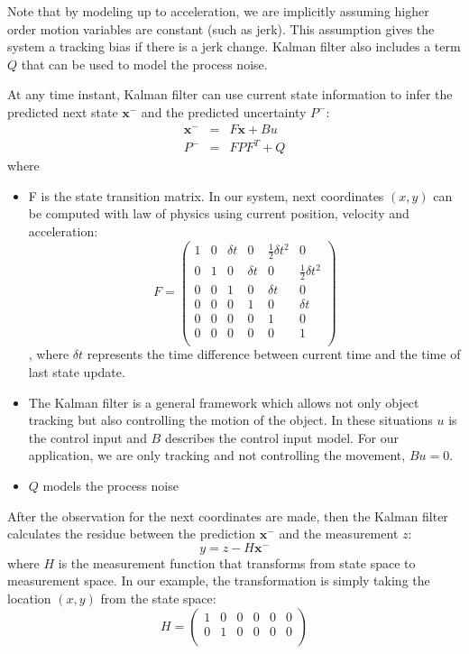 Note that by modeling up to acceleration, we are implicitly assuming higher order motion variables are constant (such as jerk). This assumption gives the system a tracking bias if there is a jerk change. Kalman filter also includes a term $Q$ that can be used to model the process noise. 

At any time instant, Kalman filter can use current state information to infer the predicted next state $\mathbf{x}^-$ and the predicted uncertainty $P^-$:
\begin{eqnarray}
\mathbf{x}^- & = &F \mathbf{x} + Bu\\
P^- & = & FPF^T + Q
\end{eqnarray}
where
\begin{itemize}
\item F is the state transition matrix. In our system, next coordinates $(x,y)$ can be computed with law of physics using current position, velocity and acceleration:
\[
F  =  \left(\begin{array}{cccccc}
1 & 0 & \delta t & 0 & \frac{1}{2}\delta t^2 & 0 \\
0 & 1 & 0 & \delta t & 0 & \frac{1}{2} \delta t^2 \\
0 & 0 & 1 & 0 & \delta t & 0\\
0 & 0 & 0 & 1 & 0 & \delta t\\
0 & 0 & 0 & 0 & 1 & 0 \\
0 & 0 & 0 & 0 & 0 & 1 \\
\end{array}\right)
\], where $\delta t$ represents the time difference between current time and the time of last state update. 
\item The Kalman filter is a general framework which allows not only object tracking but also controlling the motion of the object. In these situations $u$ is the control input and $B$ describes the control input model. For our application, we are only tracking and not controlling the movement, $Bu = 0$.
\item $Q$ models the process noise
\end{itemize}

After the observation for the next coordinates are made, then the Kalman filter calculates the residue between the prediction $\mathbf{x}^-$ and the measurement $z$:
\[
y = z - H\mathbf{x}^-
\]
where $H$ is the measurement function that transforms from state space to measurement space. In our example, the transformation is simply taking the location $(x,y)$ from the state space:
\[
H = \left(\begin{array}{cccccc}
1 & 0 & 0 & 0 & 0 & 0 \\
0 & 1 & 0 & 0 & 0 & 0 \\
\end{array}\right)
\]

